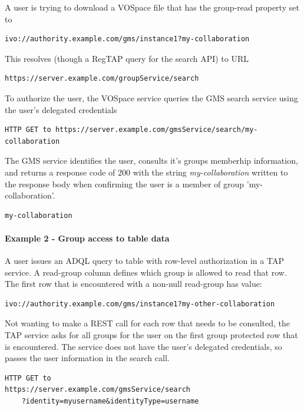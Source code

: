 \documentclass[11pt,a4paper]{ivoa}
\begin{document}
A user is trying to download a VOSpace file that has the group-read property set to

\begin{verbatim}
ivo://authority.example.com/gms/instance1?my-collaboration
\end{verbatim}

This resolves (though a RegTAP query for the search API) to URL

\begin{verbatim}
https://server.example.com/groupService/search
\end{verbatim}

To authorize the user, the VOSpace service queries the GMS search service using the user's delegated credentials

\begin{verbatim}
HTTP GET to https://server.example.com/gmsService/search/my-collaboration
\end{verbatim}

The GMS service identifies the user, consults it's groups memberhip information, and returns a response code of 200 with the string \emph{my-collaboration} written to the response body when confirming the user is a member of group 'my-collaboration'.

\begin{verbatim}
my-collaboration
\end{verbatim}

\paragraph{Example 2 - Group access to table data}

A user issues an ADQL query to table with row-level authorization in a TAP service.  A read-group column defines which group is allowed to read that row.  The first row that is encountered with a non-null read-group has value:

\begin{verbatim}
ivo://authority.example.com/gms/instance1?my-other-collaboration
\end{verbatim}

Not wanting to make a REST call for each row that needs to be consulted, the TAP service asks for all groups for the user on the first group protected row that is encountered.  The service does not have the user's delegated credentials, so passes the user information in the search call.

\begin{verbatim}
HTTP GET to
https://server.example.com/gmsService/search
    ?identity=myusername&identityType=username
\end{verbatim}
\end{document}

